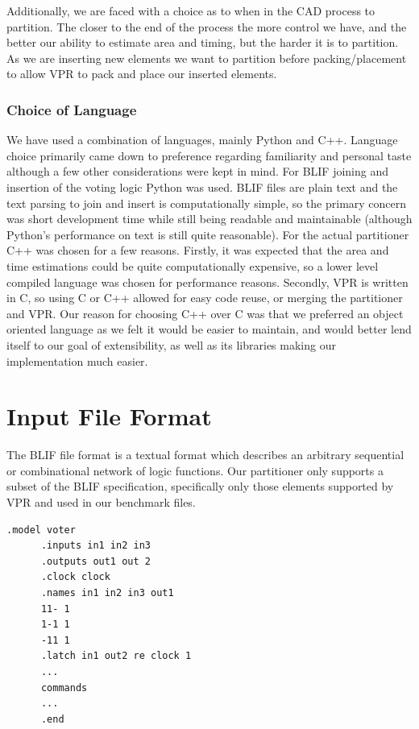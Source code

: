 \documentclass[12pt,final,oneside]{dwThesis} %
\begin{document}
   Additionally, we are faced with a choice as to when in the \gls{CAD} process to partition. The closer to the end of the process the more control we have, and the better our ability to estimate area and timing, but the harder it is to partition. As we are inserting new elements we want to partition before packing/placement to allow \gls{VPR} to pack and place our inserted elements.

   \subsubsection{Choice of Language}
   We have used a combination of languages, mainly Python and C++. Language choice primarily came down to preference regarding familiarity and personal taste although a few other considerations were kept in mind.
   For \gls{BLIF} joining and insertion of the voting logic Python was used. \gls{BLIF} files are plain text and the text parsing to join and insert is computationally simple, so the primary concern was short development time while still being readable and maintainable (although Python's performance on text is still quite reasonable)\cite{LanguageBenchmark}.
   For the actual partitioner C++ was chosen for a few reasons. Firstly, it was expected that the area and time estimations could be quite computationally expensive, so a lower level compiled language was chosen for performance reasons\cite{LanguageBenchmark}. Secondly, \gls{VPR} is written in C, so using C or C++ allowed for easy code reuse, or merging the partitioner and \gls{VPR}. Our reason for choosing C++ over C was that we preferred an object oriented language as we felt it would be easier to maintain, and would better lend itself to our goal of extensibility, as well as its libraries making our implementation much easier.

   \section{Input File Format}\label{secBlif}
   The \gls{BLIF} file format is a textual format which describes an arbitrary sequential or combinational network of logic functions\cite{BLIF}.
   Our partitioner only supports a subset of the \gls{BLIF} specification, specifically only those elements supported by \gls{VPR} and used in our benchmark files.
   \begin{lstlisting}[caption=BLIF file layout, label=SampleBlif]
      .model voter
      .inputs in1 in2 in3
      .outputs out1 out 2
      .clock clock
      .names in1 in2 in3 out1
      11- 1
      1-1 1
      -11 1
      .latch in1 out2 re clock 1
      ...
      commands
      ...
      .end
   \end{lstlisting}
\end{document}
